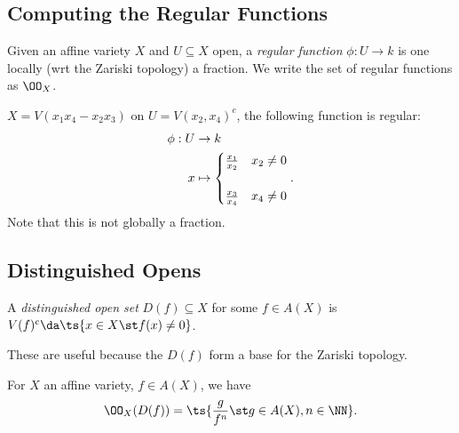 \hypertarget{computing-the-regular-functions}{%
\subsection{Computing the Regular
Functions}\label{computing-the-regular-functions}}

Given an affine variety \(X\) and \(U\subseteq X\) open, a \emph{regular
function} \(\phi: U\to k\) is one locally (wrt the Zariski topology) a
fraction. We write the set of regular functions as \(\OO_X\).

\begin{example}

\(X = V(x_1 x_4 - x_2 x_3)\) on \(U = V(x_2, x_4)^c\), the following
function is regular:
\begin{align*}  
\phi: U &\to k \\
x &\mapsto 
\begin{cases}
{x_1\over x_2} & x_2 \neq 0 \\ \\
{x_3 \over x_4} & x_4 \neq 0
\end{cases}
.\end{align*} Note that this is not globally a fraction.

\end{example}

\hypertarget{distinguished-opens}{%
\subsection{Distinguished Opens}\label{distinguished-opens}}

\begin{definition}

A \emph{distinguished open set} \(D(f) \subseteq X\) for some
\(f\in A(X)\) is \(V(f)^c \da \ts{x\in X \st f(x) \neq 0}\).

\end{definition}

These are useful because the \(D(f)\) form a base for the Zariski
topology.

\begin{proposition}[?]

For \(X\) an affine variety, \(f\in A(X)\), we have
\begin{align*} 
\OO_X(D(f)) = \ts{ {g\over f^n} \st g\in A(X), n\in \NN}
.\end{align*}

\end{proposition}

